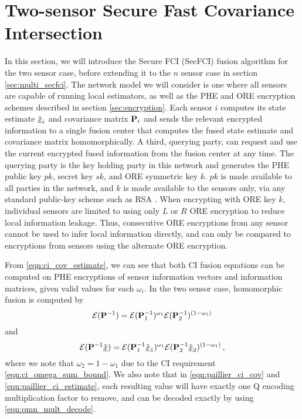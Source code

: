 \documentclass[letterpaper, 10 pt, conference]{ieeeconf}  %
\begin{document}
\section{Two-sensor Secure Fast Covariance Intersection} \label{sec:secfci}
In this section, we will introduce the Secure FCI (SecFCI) fusion algorithm for the two sensor case, before extending it to the $n$ sensor case in section \ref{sec:multi_secfci}. The network model we will consider is one where all sensors are capable of running local estimators, as well as the PHE and ORE encryption schemes described in section \ref{sec:encryption}. Each sensor $i$ computes its state estimate $\hat{{\underline{x}}}_i$ and covariance matrix ${{\mathbf{P}}}_i$ and sends the relevant encrypted information to a single fusion center that computes the fused state estimate and covariance matrix homomorphically. A third, querying party, can request and use the current encrypted fused information from the fusion center at any time. The querying party is the key holding party in this network and generates the PHE public key $pk$, secret key $sk$, and ORE symmetric key $k$. $pk$ is made available to all parties in the network, and $k$ is made available to the sensors only, via any standard public-key scheme such as RSA \cite{rivestMethodObtainingDigital1978}. When encrypting with ORE key $k$, individual sensors are limited to using only $L$ or $R$ ORE encryption to reduce local information leakage. Thus, consecutive ORE encryptions from any sensor cannot be used to infer local information directly, and can only be compared to encryptions from sensors using the alternate ORE encryption.

From \eqref{eqn:ci_cov_estimate}, we can see that both CI fusion equations can be computed on PHE encryptions of sensor information vectors and information matrices, given valid values for each $\omega_i$. In the two sensor case, homomorphic fusion is computed by
\begin{equation}
   \mathcal{E}({{\mathbf{P}}}^{-1}) = \mathcal{E}({{\mathbf{P}}}^{-1}_1)^{\omega_1}\mathcal{E}({{\mathbf{P}}}^{-1}_2)^{(1 -\omega_1)} \label{eqn:paillier_ci_cov}
\end{equation}
and
\begin{equation}
   \mathcal{E}({{\mathbf{P}}}^{-1}\hat{{\underline{x}}}) = \mathcal{E}({{\mathbf{P}}}^{-1}_1\hat{{\underline{x}}}_1)^{\omega_1}\mathcal{E}({{\mathbf{P}}}^{-1}_2\hat{{\underline{x}}}_2)^{(1 - \omega_1)}\,, \label{eqn:paillier_ci_estimate}
\end{equation}
where we note that $\omega_2=1-\omega_1$ due to the CI requirement \eqref{eqn:ci_omega_sum_bound}. We also note that in \eqref{eqn:paillier_ci_cov} and \eqref{eqn:paillier_ci_estimate}, each resulting value will have exactly one Q encoding multiplication factor to remove, and can be decoded exactly by using \eqref{eqn:qmn_mult_decode}.
   
\end{document}
